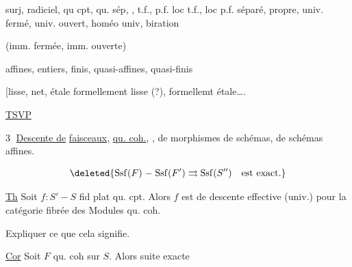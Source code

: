 

surj, radiciel,    qu cpt, qu. sép, , t.f., p.f. loc t.f., loc p.f. séparé, propre,  univ. fermé, univ. ouvert, homéo univ,  biration

  (imm. fermée, imm. ouverte)

 affines, entiers, finis, quasi-affines, quasi-finis 

[lisse, net, étale formellement lisse (?), formellemt étale\ldots.

\uline{TSVP}


\textcircled{3} \uline{Descente de}  \uline{faisceaux},   \uline{qu. coh.},  , de morphismes de schémas, de schémas affines.


\[
\deleted{\operatorname{Ssf}(F)\mathrel{-}\operatorname{Ssf}(F')\rightrightarrows\operatorname{Ssf}(S'')\quad\text{est exact.}}
\]



\uline{Th} Soit $f:S'\mathrel{-}S$ fid plat qu. cpt. Alors $f$ est de descente effective (univ.) pour la catégorie fibrée des Modules qu. coh.

Expliquer ce que cela signifie.

\uline{Cor}  Soit $F$ qu. coh sur $S$. Alors suite exacte


